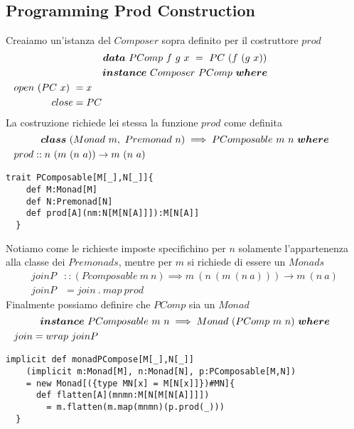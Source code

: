 \subsection{Programming Prod Construction}
\label{programming_prod_construction}
Creaiamo un'istanza del $Composer$ sopra definito per il costruttore $prod$
\begin{align*}
  \classdef{\bm{data}\ PComp\ f\ g\ x\ =\ PC\ (f\ (g\ x))}
  \classdef{\bm{instance}\ Composer\ PComp\ \bm{where} }
  open\ (PC\ x)\ &= x\\
  close &= PC
\end{align*}
La costruzione richiede lei stessa la funzione $prod$ come definita
\begin{align*}
  \classdef{\bm{class}\ (Monad\ m,\ Premonad\ n) \implies PComposable\ m\ n\ \bm{where}}
  prod &:: n\ (m\ (n\ a)) \to m\ (n\ a)
\end{align*}
\begin{lstlisting}[style=myScalastyle, caption=Prod Constructor]
  trait PComposable[M[_],N[_]]{
    def M:Monad[M]
    def N:Premonad[N]
    def prod[A](nm:N[M[N[A]]]):M[N[A]]
  }
\end{lstlisting}
Notiamo come le richieste imposte specifichino per $n$ solamente l'appartenenza
alla classe dei $Premonads$, mentre per $m$ si richiede di essere un $Monads$
\begin{align*}
  joinP &:: (Pcomposable\ m\ n) \implies m\ (n\ (m\ (n\ a))) \to m\ (n\ a)\\
  joinP &= join\ .\ map\ prod
\end{align*}
Finalmente possiamo definire che $PComp$ sia un $Monad$
\begin{align*}
  \classdef{\bm{instance}\ PComposable\ m\ n \implies Monad\ (PComp\ m\ n)\ \bm{where}}
  join &= wrap\ joinP
\end{align*}
\begin{lstlisting}[style=myScalastyle, caption=PComposable is Monad]
  implicit def monadPCompose[M[_],N[_]]
    (implicit m:Monad[M], n:Monad[N], p:PComposable[M,N])
    = new Monad[({type MN[x] = M[N[x]]})#MN]{
      def flatten[A](mnmn:M[N[M[N[A]]]])
        = m.flatten(m.map(mnmn)(p.prod(_)))
  }
  \end{lstlisting}


